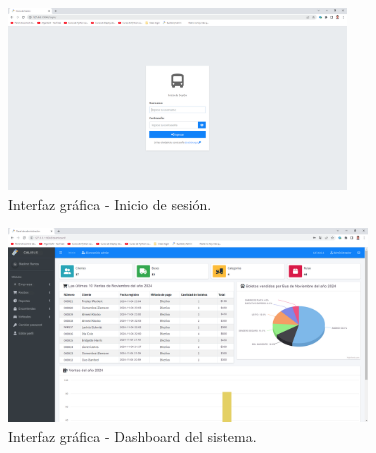 	\begin{figure}[!h] %
		\caption[Interfaz gráfica - Inicio de sesión]
		{\newline Interfaz gráfica - Inicio de sesión.} %
		\centering
		\includegraphics[width=0.8\textwidth]{imagenes/cap_3/Img_calibus/CALIBUS01.png} %
		
		\begin{flushleft}
		\end{flushleft}
		\vspace{-16pt}
		\label{fig:cali01} %
	\end{figure}
	
	
	\begin{figure}[!h] %
		\caption[Interfaz gráfica - Dashboard del sistema]
		{\newline Interfaz gráfica - Dashboard del sistema.} %
		\centering
		\includegraphics[width=0.85\textwidth]{imagenes/cap_3/Img_calibus/CALIBUS02.png} %
		
		\begin{flushleft}
		\end{flushleft}
		\vspace{-16pt}
		\label{fig:cali02} %
	\end{figure}
	
